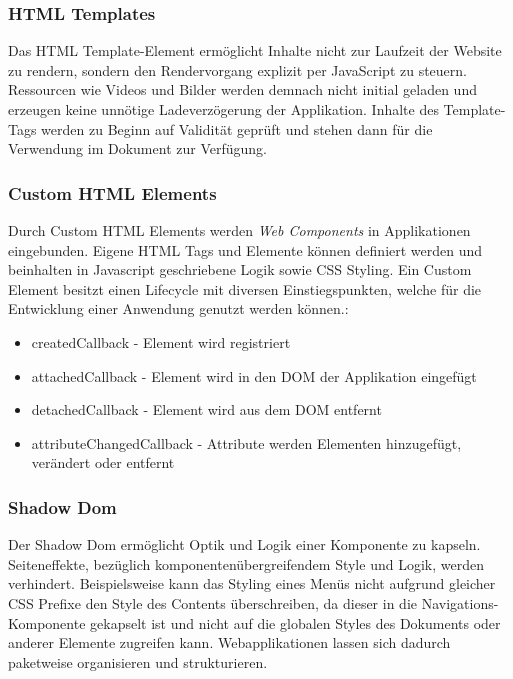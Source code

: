 \vspace{0.3cm}

\vspace{0.3cm}

\subsubsection{HTML Templates}

Das HTML Template-Element ermöglicht Inhalte nicht zur Laufzeit der Website zu rendern,
sondern den Rendervorgang explizit per JavaScript zu steuern. Ressourcen wie Videos und Bilder werden demnach
nicht initial geladen und erzeugen keine unnötige Ladeverzögerung der Applikation.
Inhalte des Template-Tags werden zu Beginn auf Validität geprüft und stehen dann für die Verwendung im Dokument
zur Verfügung.

\subsubsection{Custom HTML Elements}

Durch Custom HTML Elements werden \emph{Web Components} in Applikationen eingebunden.
Eigene HTML Tags und Elemente können definiert werden und beinhalten in Javascript geschriebene Logik sowie CSS Styling.
Ein Custom Element besitzt einen Lifecycle mit diversen Einstiegspunkten, welche für die Entwicklung einer Anwendung genutzt werden können.:

\begin{itemize}
\item createdCallback - Element wird registriert
\item attachedCallback - Element wird in den DOM der Applikation eingefügt
\item detachedCallback - Element wird aus dem DOM entfernt
\item attributeChangedCallback - Attribute werden Elementen hinzugefügt, verändert oder entfernt
\end{itemize}


\subsubsection{Shadow Dom}
Der Shadow Dom ermöglicht Optik und Logik einer Komponente zu kapseln.
Seiteneffekte, bezüglich komponentenübergreifendem Style und Logik, werden verhindert.
Beispielsweise kann das Styling eines Menüs nicht aufgrund gleicher CSS Prefixe den Style des Contents überschreiben,
da dieser in die Navigations-Komponente gekapselt ist und nicht auf die globalen Styles des Dokuments oder anderer Elemente zugreifen kann.
Webapplikationen lassen sich dadurch paketweise organisieren und strukturieren.
